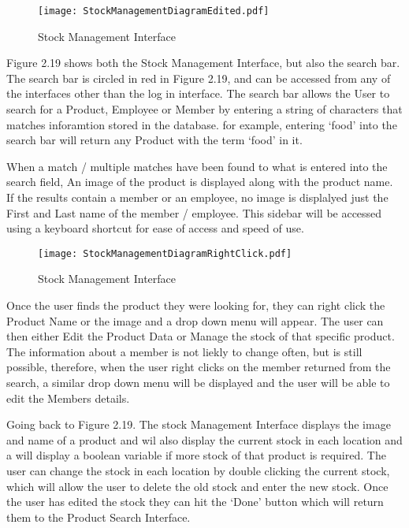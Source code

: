 \begin{figure}[H]
\caption{Stock Management Interface} \label{fig:Stock Management Interface}
\hfill\texttt{[image: StockManagementDiagramEdited.pdf]}\hspace*{\fill}
\end{figure}

Figure 2.19 shows both the Stock Management Interface, but also the search bar. The search bar is circled in red in Figure 2.19, and can be accessed from any of the interfaces other than the log in interface. The search bar allows the User to search for a Product, Employee or Member by entering a string of characters that matches inforamtion stored in the database. for example, entering `food' into the search bar will return any Product with the term `food' in it. \par

  When a match / multiple matches have been found to what is entered into the search field, An image of the product is displayed along with the product name. If the results contain a member or an employee, no image is displalyed just the First and Last name of the member / employee. This sidebar will be accessed using a keyboard shortcut for ease of access and speed of use. \par


\begin{figure}[H]
\caption{Stock Management Interface} \label{fig:Stock Management Interface}
\hfill\texttt{[image: StockManagementDiagramRightClick.pdf]}\hspace*{\fill}
\end{figure}

Once the user finds the product they were looking for, they can right click the Product Name or the image and a drop down menu will appear. The user can then either Edit the Product Data or Manage the stock of that specific product. The information about a member is not liekly to change often, but is still possible, therefore, when the user right clicks on the member returned from the search, a similar drop down menu will be displayed and the user will be able to edit the Members details. \par

Going back to Figure 2.19. The stock Management Interface displays the image and name of a product and wil also display the current stock in each location and a will display a boolean variable if more stock of that product is required. The user can change the stock in each location by double clicking the current stock, which will allow the user to delete the old stock and enter the new stock. Once the user has edited the stock they can hit the `Done' button which will return them to the Product Search Interface.\par

